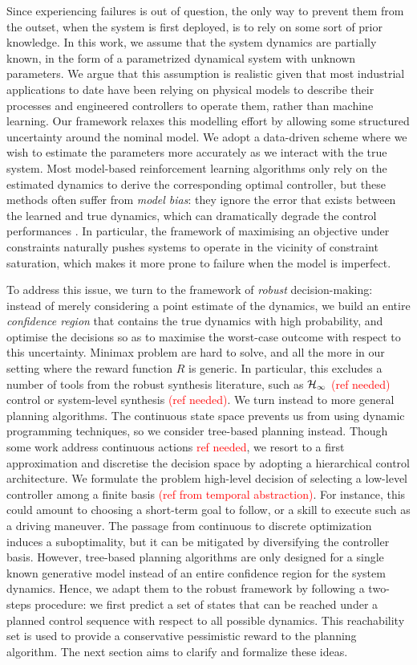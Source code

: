 \documentclass{article}
\newcommand{\todo}[1]{\textcolor{red}{#1}}
\begin{document}
Since experiencing failures is out of question, the only way to prevent them from the outset, when the system is first deployed, is to rely on some sort of prior knowledge. In this work, we assume that the system dynamics are partially known, in the form of a parametrized dynamical system with unknown parameters. We argue that this assumption is realistic given that most industrial applications to date have been relying on physical models to describe their processes and engineered controllers to operate them, rather than machine learning. Our framework relaxes this modelling effort by allowing some structured uncertainty around the nominal model. We adopt a data-driven scheme where we wish to estimate the parameters more accurately as we interact with the true system. Most model-based reinforcement learning algorithms only rely on the estimated dynamics to derive the corresponding optimal controller, but these methods often suffer from \emph{model bias}: they ignore the error that exists between the learned and true dynamics, which can dramatically degrade the control performances \citep{Schneider1997}. In particular, the framework of maximising an objective under constraints naturally pushes systems to operate in the vicinity of constraint saturation, which makes it more prone to failure when the model is imperfect.

To address this issue, we turn to the framework of \emph{robust} decision-making: instead of merely considering a point estimate of the dynamics, we build an entire \emph{confidence region} that contains the true dynamics with high probability, and optimise the decisions so as to maximise the worst-case outcome with respect to this uncertainty. Minimax problem are hard to solve, and all the more in our setting where the reward function $R$ is generic. In particular, this excludes a number of tools from the robust synthesis literature, such as $\mathcal{H}_\infty$ \todo{(ref needed)} control or system-level synthesis \todo{(ref needed)}. We turn instead to more general planning algorithms. The continuous state space prevents us from using dynamic programming techniques, so we consider tree-based planning instead. Though some work address continuous actions \todo{ref needed}, we resort to a first approximation and discretise the decision space by adopting a hierarchical control architecture. We  formulate the problem high-level decision of selecting a low-level controller among a finite basis \todo{(ref from temporal abstraction)}. For instance, this could amount to choosing a short-term goal to follow, or a skill to execute such as a driving maneuver. The passage from continuous to discrete optimization induces a suboptimality, but it can be mitigated by diversifying the controller basis. However, tree-based planning algorithms are only designed for a single known generative model instead of an entire confidence region for the system dynamics. Hence, we adapt them to the robust framework by following a two-steps procedure: we first predict a set of states that can be reached under a planned control sequence with respect to all possible dynamics. This reachability set is used to provide a conservative pessimistic reward to the planning algorithm. The next section aims to clarify and formalize these ideas.
\end{document}
